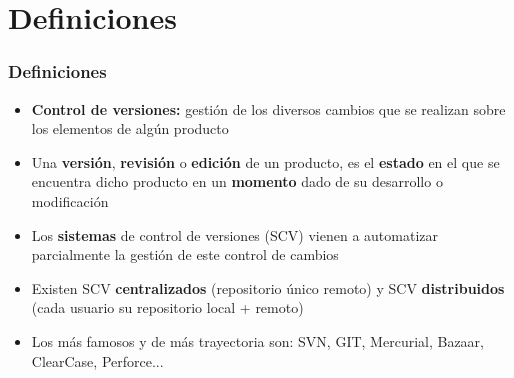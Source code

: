 \section{Definiciones}
\frame
{
\frametitle{Definiciones}
\begin{itemize}
\item \textbf{Control de versiones:} gestión de los diversos cambios que se realizan sobre los elementos de algún producto
\item Una \textbf{versión}, \textbf{revisión} o \textbf{edición} de un producto, es el \textbf{estado} en el que se encuentra dicho producto en un \textbf{momento} dado de su desarrollo o modificación
\item Los \textbf{sistemas} de control de versiones (SCV) vienen a automatizar parcialmente la gestión de este control de cambios
\item Existen SCV \textbf{centralizados} (repositorio único remoto) y SCV \textbf{distribuidos} (cada usuario su repositorio local + remoto)
\item Los más famosos y de más trayectoria son: SVN, GIT, Mercurial, Bazaar, ClearCase, Perforce...
\end{itemize}
}


